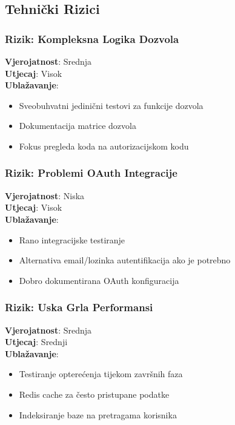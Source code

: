 \documentclass[12pt,a4paper]{article}
\begin{document}
\subsection{Tehnički Rizici}

\subsubsection{Rizik: Kompleksna Logika Dozvola}
\textbf{Vjerojatnost}: Srednja\\
\textbf{Utjecaj}: Visok\\
\textbf{Ublažavanje}:
\begin{itemize}
    \item Sveobuhvatni jedinični testovi za funkcije dozvola
    \item Dokumentacija matrice dozvola
    \item Fokus pregleda koda na autorizacijskom kodu
\end{itemize}

\subsubsection{Rizik: Problemi OAuth Integracije}
\textbf{Vjerojatnost}: Niska\\
\textbf{Utjecaj}: Visok\\
\textbf{Ublažavanje}:
\begin{itemize}
    \item Rano integracijske testiranje
    \item Alternativa email/lozinka autentifikacija ako je potrebno
    \item Dobro dokumentirana OAuth konfiguracija
\end{itemize}

\subsubsection{Rizik: Uska Grla Performansi}
\textbf{Vjerojatnost}: Srednja\\
\textbf{Utjecaj}: Srednji\\
\textbf{Ublažavanje}:
\begin{itemize}
    \item Testiranje opterećenja tijekom završnih faza
    \item Redis cache za često pristupane podatke
    \item Indeksiranje baze na pretragama korisnika
\end{itemize}
\end{document}
